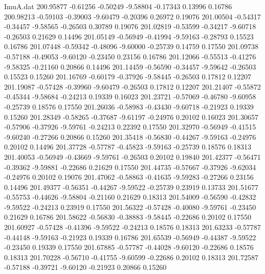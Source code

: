 \begin{filecontents}{ImuA.dat}
 200.95877   -0.61256   -0.50249   -9.58804   -0.17343    0.13996    0.16786
 200.98213   -0.59103   -0.39003   -9.60479   -0.20396    0.26972    0.19076
 201.00504   -0.54317   -0.34457   -9.58565   -0.26503    0.30789    0.19076
 201.02819   -0.53599   -0.34217   -9.60718   -0.26503    0.21629    0.14496
 201.05149   -0.56949   -0.41994   -9.59163   -0.28793    0.15523    0.16786
 201.07448   -0.59342   -0.48096   -9.60000   -0.25739    0.14759    0.17550
 201.09738   -0.57188   -0.49053   -9.60120   -0.23450    0.23156    0.16786
 201.12066   -0.55513   -0.41276   -9.58325   -0.21160    0.20866    0.14496
 201.14459   -0.56590   -0.34457   -9.59642   -0.26503    0.15523    0.15260
 201.16769   -0.60179   -0.37926   -9.58445   -0.26503    0.17812    0.12207
 201.19087   -0.57428   -0.39960   -9.60479   -0.26503    0.17812    0.12207
 201.21407   -0.55872   -0.45344   -9.58684   -0.24213    0.19339    0.16023
 201.23721   -0.57069   -0.46780   -9.60958   -0.25739    0.18576    0.17550
 201.26036   -0.58983   -0.43430   -9.60718   -0.21923    0.19339    0.15260
 201.28349   -0.58265   -0.37687   -9.61197   -0.24976    0.20102    0.16023
 201.30657   -0.57906   -0.37926   -9.59761   -0.24213    0.22392    0.17550
 201.32970   -0.56949   -0.41515   -9.60240   -0.27266    0.20866    0.15260
 201.35418   -0.56830   -0.44267   -9.59163   -0.24976    0.20102    0.14496
 201.37728   -0.57787   -0.45823   -9.59163   -0.25739    0.18576    0.18313
 201.40053   -0.56949   -0.43669   -9.59761   -0.26503    0.20102    0.19840
 201.42377   -0.56471   -0.39362   -9.59881   -0.22686    0.21629    0.17550
 201.44735   -0.57667   -0.37926   -9.62034   -0.24976    0.20102    0.19076
 201.47062   -0.58863   -0.41635   -9.59283   -0.27266    0.23156    0.14496
 201.49377   -0.56351   -0.44267   -9.59522   -0.25739    0.23919    0.13733
 201.51677   -0.55753   -0.44626   -9.58804   -0.21160    0.21629    0.18313
 201.54009   -0.56590   -0.42832   -9.59522   -0.24213    0.23919    0.17550
 201.56322   -0.57428   -0.40080   -9.59761   -0.23450    0.21629    0.16786
 201.58622   -0.56830   -0.38883   -9.58445   -0.22686    0.20102    0.17550
 201.60927   -0.57428   -0.41396   -9.59522   -0.24213    0.18576    0.18313
 201.63233   -0.57787   -0.44148   -9.59163   -0.21923    0.19339    0.16786
 201.65539   -0.56949   -0.44387   -9.59522   -0.23450    0.19339    0.17550
 201.67885   -0.57787   -0.44028   -9.60120   -0.22686    0.18576    0.18313
 201.70228   -0.56710   -0.41755   -9.60599   -0.22686    0.20102    0.18313
 201.72587   -0.57188   -0.39721   -9.60120   -0.21923    0.20866    0.15260

\end{filecontents}
